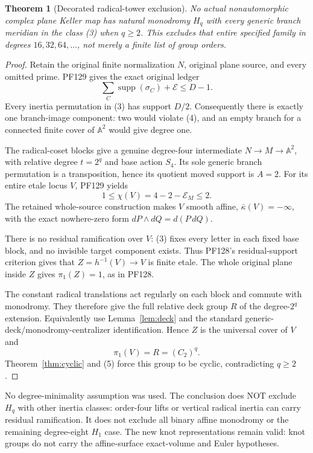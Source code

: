 \documentclass[11pt]{article}
\newtheorem{theorem}{Theorem}
\newcommand{\A}{\mathbb A}
\newcommand{\Eta}{\mathcal E}
\begin{document}
\begin{theorem}[Decorated radical-tower exclusion]\label{thm:tower}
No actual nonautomorphic complex plane Keller map has natural monodromy
$H_q$ with \emph{every generic branch meridian in the class (3)}
when $q\ge2$. This excludes that entire specified family in degrees
$16,32,64,\ldots$, not merely a finite list of group orders.
\end{theorem}
\begin{proof}
Retain the original finite normalization $N$, original plane source,
and every omitted prime. PF129 gives the exact original ledger
\[
             \sum_C\operatorname{supp}(\sigma_C)+\Eta\le D-1.
                                                               \tag{4}
\]
Every inertia permutation in (3) has support $D/2$. Consequently there
is exactly one branch-image component: two would violate (4), and an
empty branch for a connected finite cover of $\A^2$ would give degree one.

The radical-coset blocks give a genuine degree-four intermediate
$N\to M\to\A^2$, with relative degree $t=2^q$ and base action $S_4$.
Its sole generic branch permutation is a transposition, hence its
quotient moved support is $A=2$.
For its entire etale locus $V$, PF129 yields
\[
                    1\le\chi(V)=4-2-\Eta_M\le2.             \tag{5}
\]
The retained whole-source construction makes $V$ smooth affine,
$\bar\kappa(V)=-\infty$, with the exact nowhere-zero form
$dP\wedge dQ=d(P\,dQ)$.

There is no residual ramification over $V$: (3) fixes every letter
in each fixed base block, and no invisible target component exists.
Thus PF128's residual-support criterion gives that
$Z=h^{-1}(V)\to V$ is finite etale. The whole original plane inside
$Z$ gives $\pi_1(Z)=1$, as in PF128.

The constant radical translations act regularly on each block and
commute with monodromy. They therefore give the full relative deck
group $R$ of the degree-$2^q$ extension. Equivalently use
Lemma~\ref{lem:deck} and the standard generic-deck/monodromy-centralizer
identification. Hence $Z$ is the universal cover of $V$ and
\[
                         \pi_1(V)=R=(C_2)^q.
\]
Theorem~\ref{thm:cyclic} and (5) force this group to be cyclic,
contradicting $q\ge2$.
\end{proof}

No degree-minimality assumption was used. The conclusion does NOT
exclude $H_q$ with other inertia classes: order-four lifts or vertical
radical inertia can carry residual ramification. It does not exclude
all binary affine monodromy or the remaining degree-eight $H_1$ case.
The new knot representations remain valid: knot groups do not carry
the affine-surface exact-volume and Euler hypotheses.
\end{document}
